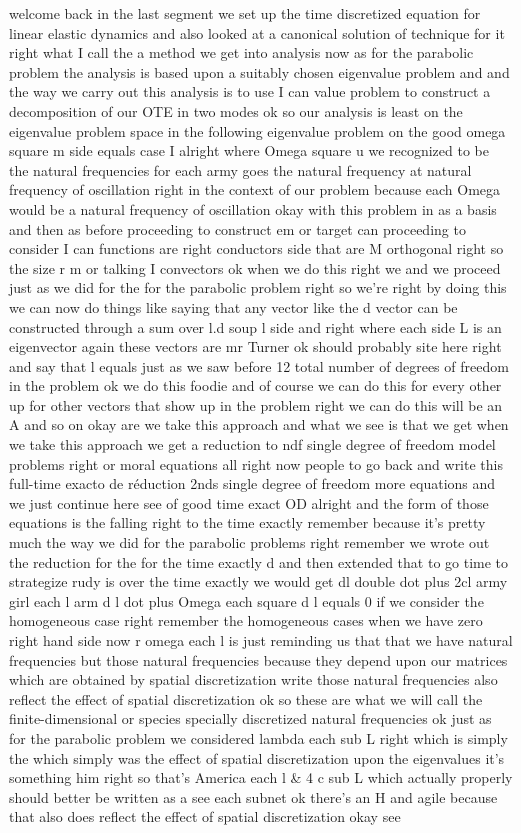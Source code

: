 \documentclass[10pt]{article}
\begin{document}
welcome back in the last segment we set up the time discretized equation for linear elastic dynamics and also looked at a canonical solution of technique for it right what I call the a method we get into analysis now as for the parabolic problem the analysis is based upon a suitably chosen eigenvalue problem and and the way we carry out this analysis is to use I can value problem to construct a decomposition of our OTE in two modes ok so our analysis is least on the eigenvalue problem space in the following eigenvalue problem on the good omega square m side equals case I alright where Omega square u we recognized to be the natural frequencies for each army goes the natural frequency at natural frequency of oscillation right in the context of our problem because each Omega would be a natural frequency of oscillation okay with this problem in as a basis and then as before proceeding to construct em or target can proceeding to consider I can functions are right conductors side that are M orthogonal right so the size r m or talking I convectors ok when we do this right we and we proceed just as we did for the for the parabolic problem right so we're right by doing this we can now do things like saying that any vector like the d vector can be constructed through a sum over l.d soup l side and right where each side L is an eigenvector again these vectors are mr Turner ok should probably site here right and say that l equals just as we saw before 12 total number of degrees of freedom in the problem ok we do this foodie and of course we can do this for every other up for other vectors that show up in the problem right we can do this will be an A and so on okay are we take this approach and what we see is that we get when we take this approach we get a reduction to ndf single degree of freedom model problems right or moral equations all right now people to go back and write this full-time exacto de réduction 2nds single degree of freedom more equations and we just continue here see of good time exact OD alright and the form of those equations is the falling right to the time exactly remember because it's pretty much the way we did for the parabolic problems right remember we wrote out the reduction for the for the time exactly d and then extended that to go time to strategize rudy is over the time exactly we would get dl double dot plus 2cl army girl each l arm d l dot plus Omega each square d l equals 0 if we consider the homogeneous case right remember the homogeneous cases when we have zero right hand side now r omega each l is just reminding us that that we have natural frequencies but those natural frequencies because they depend upon our matrices which are obtained by spatial discretization write those natural frequencies also reflect the effect of spatial discretization ok so these are what we will call the finite-dimensional or species specially discretized natural frequencies ok just as for the parabolic problem we considered lambda each sub L right which is simply the which simply was the effect of spatial discretization upon the eigenvalues it's something him right so that's America each l \& 4 c sub L which actually properly should better be written as a see each subnet ok there's an H and agile because that also does reflect the effect of spatial discretization okay see 
\end{document}
